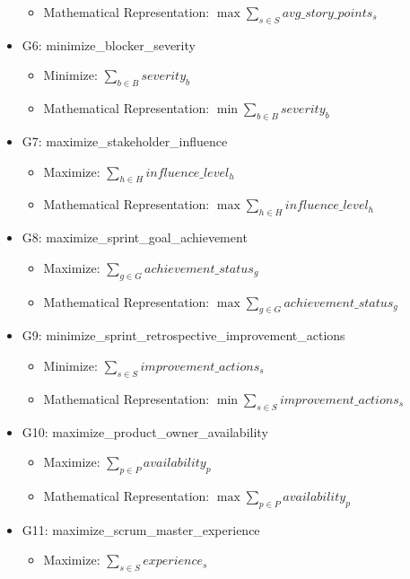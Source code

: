 \documentclass{article}
\begin{document}
\begin{itemize}
\begin{itemize}
            \item Mathematical Representation: $\max \sum_{s \in S} avg\_story\_points_s$
        \end{itemize}
    \item G6: minimize\_blocker\_severity
        \begin{itemize}
            \item Minimize: $\sum_{b \in B} severity_b$
            \item Mathematical Representation: $\min \sum_{b \in B} severity_b$
        \end{itemize}
    \item G7: maximize\_stakeholder\_influence
        \begin{itemize}
            \item Maximize: $\sum_{h \in H} influence\_level_h$
            \item Mathematical Representation: $\max \sum_{h \in H} influence\_level_h$
        \end{itemize}
    \item G8: maximize\_sprint\_goal\_achievement
        \begin{itemize}
            \item Maximize: $\sum_{g \in G} achievement\_status_g$
            \item Mathematical Representation: $\max \sum_{g \in G} achievement\_status_g$
        \end{itemize}
    \item G9: minimize\_sprint\_retrospective\_improvement\_actions
        \begin{itemize}
            \item Minimize: $\sum_{s \in S} improvement\_actions_s$
            \item Mathematical Representation: $\min \sum_{s \in S} improvement\_actions_s$
        \end{itemize}
    \item G10: maximize\_product\_owner\_availability
        \begin{itemize}
            \item Maximize: $\sum_{p \in P} availability_p$
            \item Mathematical Representation: $\max \sum_{p \in P} availability_p$
        \end{itemize}
    \item G11: maximize\_scrum\_master\_experience
        \begin{itemize}
            \item Maximize: $\sum_{s \in S} experience_s$

\end{itemize}
\end{itemize}
\end{document}
